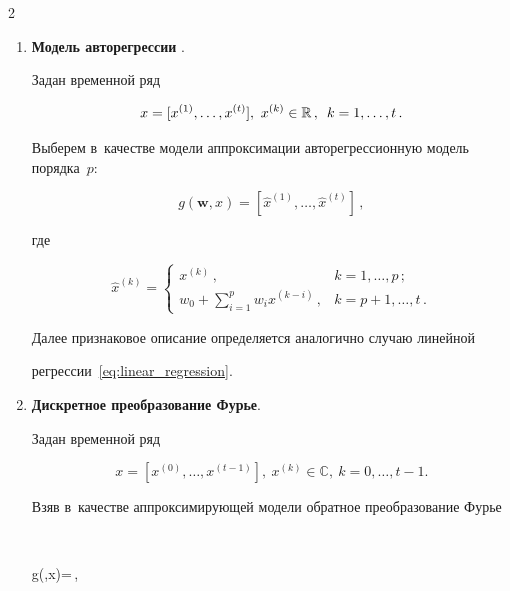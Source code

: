 \begin{multicols}{2}
\begin{enumerate}[1.]
\item \textbf{Модель авторегрессии {}}.





Задан временной ряд


$$


x = [x^{(1)},\dots,x^{(t)}],\ x^{(k)}\in\mathbb{R}\,,\enskip k=1,\dots,t\,.


$$


Выберем в~качестве модели аппроксимации авторегрессионную модель порядка~$p$:


\begin{equation*}


g(\mathbf{w},x)=\left[\hat{x}^{(1)},\dots,\hat{x}^{(t)}\right]\,,


\label{eq:autoregressive_model}


\end{equation*}


где


\begin{equation*}


\hat{x}^{(k)}=


\begin{cases}


x^{(k)}\,, & k=1,\dots,p\,;\\


w_0 + \sum\limits_{i=1}^{p} w_i x^{(k-i)}\,, & k=p+1,\dots,t\,.


\end{cases}


\end{equation*}


Далее признаковое описание определяется аналогично случаю линейной 


регрессии~\eqref{eq:linear_regression}.





\item \textbf{Дискретное преобразование Фурье}.


Задан временной ряд


$$


x = \left[x^{(0)},\dots,x^{(t-1)}\right],\ x^{(k)}\in\mathbb{C},\ k=0,\dots,t-1.


$$


Взяв в~качестве аппроксимирующей модели обратное преобразование Фурье


$$


g(,x)=\,,



\end{enumerate}
\end{multicols}
